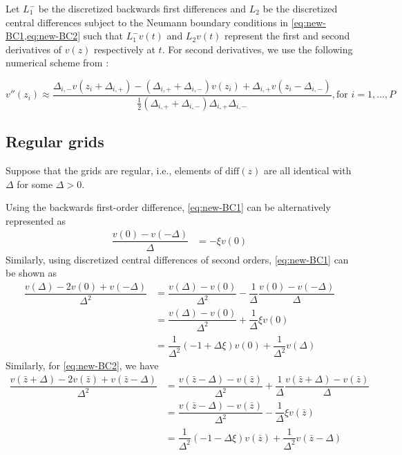 \documentclass[11pt]{article}
\begin{document}
Let $L_1^{-}$ be the discretized backwards first differences and $L_2$ be the discretized central differences subject to the Neumann boundary conditions in \cref{eq:new-BC1,eq:new-BC2} such that $L_1^{-} v(t)$ and $L_2 v(t)$ represent the first and second derivatives of $v(z)$ respectively at $t$. For second derivatives, we use the following numerical scheme from \cite{achdou17}:

\begin{equation}
v''(z_i) \approx \dfrac{ \Delta_{i,-} v( z_i + \Delta_{i,+}) - (\Delta_{i,+} + \Delta_{i,-}) v( z_i ) + \Delta_{i,+} v( z_i - \Delta_{i,-})}{\frac{1}{2}(\Delta_{i,+} + \Delta_{i,-}) \Delta_{i,+} \Delta_{i,-} }, \text{for } i = 1, \ldots, P
\end{equation}





\subsection{Regular grids}
Suppose that the grids are regular, i.e., elements of $\text{diff}(z)$ are all identical with $\Delta$ for some $\Delta > 0$.

Using the backwards first-order difference, \eqref{eq:new-BC1} can be alternatively represented as
\begin{align}
\dfrac{v(0) - v(-\Delta)}{\Delta} &= - \xi v(0)
\end{align}
Similarly, using discretized central differences of second orders, \eqref{eq:new-BC1} can be shown as
\begin{align}
\dfrac{v (\Delta) - 2 v(0) + v(-\Delta)}{\Delta^2} &=   \dfrac{v(\Delta) - v(0)}{\Delta^2} - \dfrac{1}{\Delta}\dfrac{v (0) - v(-\Delta) }{\Delta}  \\
&= \dfrac{v(\Delta) - v(0)}{\Delta^2} + \dfrac{1}{\Delta} \xi v(0)  \\ 
&= \dfrac{1}{\Delta^2}  (- 1 + \Delta \xi) v(0)  + \dfrac{1}{\Delta^2}  v(\Delta)  
\end{align}
Similarly, for \eqref{eq:new-BC2}, we have
\begin{align}
\dfrac{v (\bar{z} + \Delta) - 2 v(\bar{z} ) + v(\bar{z} -\Delta)}{\Delta^2} &=   \dfrac{v(\bar{z} - \Delta) - v(\bar{z})}{\Delta^2} + \dfrac{1}{\Delta}\dfrac{ v(\bar{z}+\Delta) - v (\bar{z}) }{\Delta}  \\
&= \dfrac{v(\bar{z} - \Delta) - v(\bar{z})}{\Delta^2}  - \dfrac{1}{\Delta} \xi v(\bar{z})  \\ 
&= \dfrac{1}{\Delta^2}  (- 1 - \Delta \xi) v(\bar{z})  + \dfrac{1}{\Delta^2}  v(\bar{z} - \Delta)  
\end{align}
\end{document}
